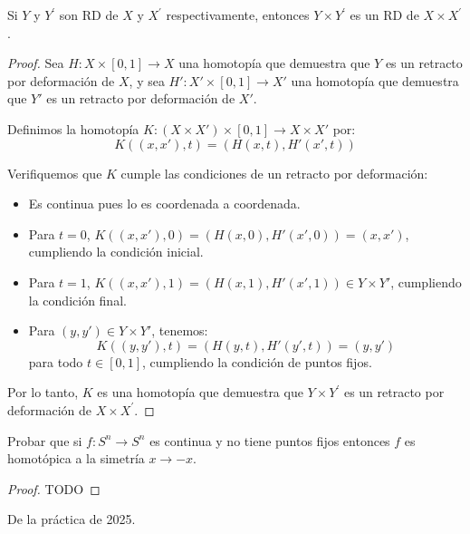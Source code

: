 \documentclass{article}
\theoremstyle{plain}
\theoremstyle{definition}
\newenvironment{ejercicio}[1]{\begin{trivlist}
\item[\hskip \labelsep {\bfseries Ejercicio}\hskip \labelsep {\bfseries #1.}]}{\end{trivlist}}
\begin{document}
\begin{ejercicio}{13}
    Si \( Y \) y \( Y^{\prime} \) son RD de \( X \) y \( X^{\prime} \) respectivamente, entonces \( Y\times Y^{\prime} \) es un RD de \( X\times X^{\prime} \).
\end{ejercicio}
\begin{proof}
    Sea \( H : X \times [0, 1] \to X \) una homotopía que demuestra que \( Y \) es un retracto por deformación de \( X \), y sea \( H' : X' \times [0, 1] \to X' \) una homotopía que demuestra que \( Y' \) es un retracto por deformación de \( X' \).

    Definimos la homotopía \( K : (X \times X') \times [0, 1] \to X \times X' \) por:
    \[
        K((x, x'), t) = (H(x, t), H'(x', t))
    \]

    Verifiquemos que \( K \) cumple las condiciones de un retracto por deformación:
    \begin{itemize}
        \item Es continua pues lo es coordenada a coordenada.
        \item Para \( t=0 \), \( K((x, x'), 0) = (H(x, 0), H'(x', 0)) = (x, x') \), cumpliendo la condición inicial.
        \item Para \( t=1 \), \( K((x, x'), 1) = (H(x, 1), H'(x', 1)) \in Y \times Y' \), cumpliendo la condición final.
        \item Para \( (y, y') \in Y \times Y' \), tenemos:
              \[
                  K((y, y'), t) = (H(y, t), H'(y', t)) = (y, y')
              \]
              para todo \( t \in [0, 1] \), cumpliendo la condición de puntos fijos.
    \end{itemize}

    Por lo tanto, \( K \) es una homotopía que demuestra que \( Y\times Y^{\prime} \) es un retracto por deformación de \( X\times X^{\prime} \).
\end{proof}

\vspace{0.5cm}

\begin{ejercicio}{14}
    Probar que si \( f:S^{n}\rightarrow S^{n} \) es continua y no tiene puntos fijos entonces \( f \) es homotópica a la simetría \( x\rightarrow-x \).
\end{ejercicio}
\begin{proof}
    TODO
\end{proof}

De la práctica de 2025.
\end{document}

